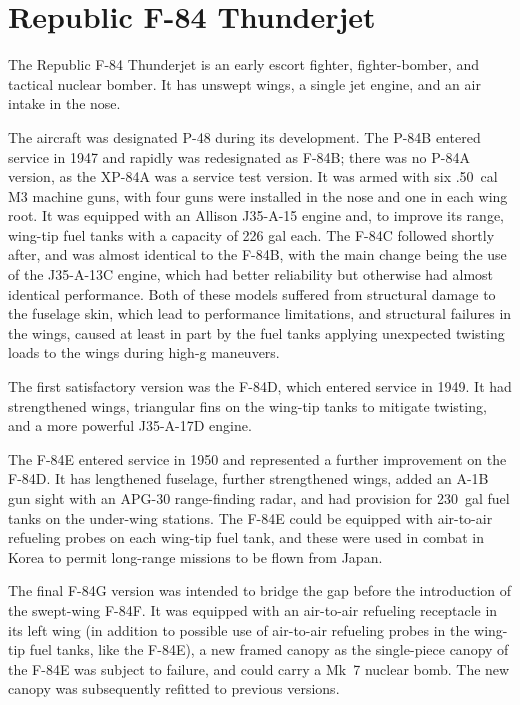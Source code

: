 \section*{Republic F-84 Thunderjet}

The Republic F-84 Thunderjet is an early escort fighter, fighter-bomber, and tactical nuclear bomber. It has unswept wings, a single jet engine, and an air intake in the nose. 

The aircraft was designated P-48 during its development. The P-84B entered service in 1947 and rapidly was redesignated as F-84B; there was no P-84A version, as the XP-84A was a service test version. It was armed with six .50~cal M3 machine guns, with four guns were installed in the nose and one in each wing root. It was equipped with an Allison J35-A-15 engine and, to improve its range, wing-tip fuel tanks with a capacity of 226 gal each. The F-84C followed shortly after, and was almost identical to the F-84B, with the main change being the use of the J35-A-13C engine, which had better reliability but otherwise had almost identical performance. Both of these models suffered from structural damage to the fuselage skin, which lead to performance limitations, and structural failures in the wings, caused at least in part by the fuel tanks applying unexpected twisting loads to the wings during high-g maneuvers.

The first satisfactory version was the F-84D, which entered service in 1949. It had strengthened wings, triangular fins on the wing-tip tanks to mitigate twisting, and a more powerful J35-A-17D engine.

The F-84E entered service in 1950 and represented a further improvement on the F-84D. It has lengthened fuselage, further strengthened wings, added an A-1B gun sight with an APG-30 range-finding radar, and had provision for 230~gal fuel tanks on the under-wing stations. The F-84E could be equipped with air-to-air refueling probes on each wing-tip fuel tank, and these were used in combat in Korea to permit long-range missions to be flown from Japan.

The final F-84G version was intended to bridge the gap before the introduction of the swept-wing F-84F. It was equipped with an air-to-air refueling receptacle in its left wing (in addition to possible use of air-to-air refueling probes in the wing-tip fuel tanks, like the F-84E), a new framed canopy as the single-piece canopy of the F-84E was subject to failure, and could carry a Mk~7 nuclear bomb. The new canopy was subsequently refitted to previous versions.

